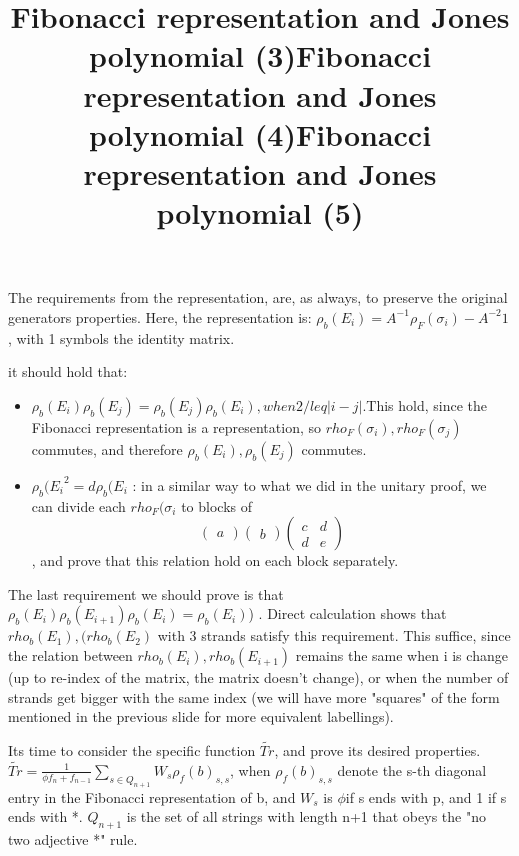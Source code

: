 \documentclass{article}
\begin{document}
\title{Fibonacci representation and Jones polynomial (3)}
The requirements from the representation, are, as always, to preserve the original generators properties.
Here, the representation is: $\rho_{b}(E_{i}) = A^{-1}\rho_{F}(\sigma_{i}) - A^{-2}1$ , with 1 symbols the identity matrix.

it should hold that:
\begin{itemize}
\item $\rho_{b}(E_{i})\rho_{b}(E_{j}) = \rho_{b}(E_{j})\rho_{b}(E_{i}), when 2 /leq |i-j|$.This hold, since the Fibonacci representation is a representation, so $rho_{F}(\sigma_{i}),rho_{F}(\sigma_{j})$ commutes, and therefore $\rho_{b}(E_{i}),\rho_{b}(E_{j})$ commutes.
\item  ${\rho_{b}(E_{i}}^{2} = d\rho_{b}(E_{i}$ : in a similar way to what we did in the unitary proof, we can divide each  $rho_{F}(\sigma_{i}$ to blocks of
\[
\begin{pmatrix} a \end{pmatrix}
\begin{pmatrix} b \end{pmatrix}
\begin{pmatrix} c & d \\ d & e \end{pmatrix}
\], and prove that this relation hold on each block separately.  
\end{itemize}



\title{Fibonacci representation and Jones polynomial (4)}
The last requirement we should prove is that  
 $\rho_{b}(E_{i})\rho_{b}(E_{i+1})\rho_{b}(E_{i}) = \rho_{b}(E_{i})$)
 . Direct calculation shows that $rho_{b}(E_{1}), (rho_{b}(E_{2})$ with 3 strands satisfy this requirement. This suffice, since the relation between $rho_{b}(E_{i}), rho_{b}(E_{i+1})$ remains the same when i is change (up to re-index of the matrix, the matrix doesn't change), or when the number of strands get bigger with the same index (we will have more "squares" of the form mentioned in the previous slide for more equivalent labellings).


\title{Fibonacci representation and Jones polynomial (5)}
Its time to consider the specific function $\tilde{Tr}$, and prove its desired properties.
$\tilde{Tr} = \frac{1}{{\phi}f_{n}+f_{n-1}}\sum\limits_{s \in Q_{n+1}}{W_{s}}\rho_{f}(b)_{s,s}$,
when $\rho_{f}(b)_{s,s}$ denote the s-th diagonal entry in the Fibonacci representation of b,
and $W_{s}$ is $\phi$if s ends with p, and 1 if s ends with *. $Q_{n+1}$ is the set of all strings with length n+1 that obeys the "no two adjective *" rule. 
\end{document}
